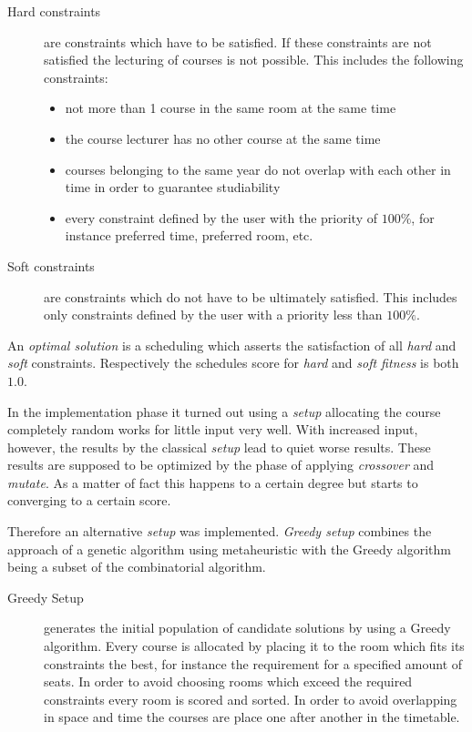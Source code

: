 \begin{description}
\item[Hard constraints] are constraints which have to be satisfied. If these constraints are not satisfied the lecturing of courses is not possible. This includes the following constraints:

\begin{itemize}
\item not more than 1 course in the same room at the same time

\item the course lecturer has no other course at the same time

\item courses belonging to the same year do not overlap with each other in time in order to guarantee studiability

\item every constraint defined by the user with the priority of $100\%$, for instance preferred time, preferred room, etc.
\end{itemize}

\item[Soft constraints] are constraints which do not have to be ultimately satisfied. This includes only constraints defined by the user with a priority less than $100\%$.
\end{description}

An \emph{optimal solution} is a scheduling which asserts the satisfaction of all \emph{hard} and \emph{soft} constraints. Respectively the schedules score for \emph{hard} and \emph{soft fitness} is both $1.0$.

In the implementation phase it turned out using a \emph{setup} allocating the course completely random works for little input very well. With increased input, however, the results by  the classical \emph{setup} lead to quiet worse results. These results are supposed to be optimized by the phase of applying \emph{crossover} and \emph{mutate}. As a matter of fact this happens to a certain degree but starts to converging to a certain score.

Therefore an alternative \emph{setup} was implemented. \emph{Greedy setup} combines the approach of a genetic algorithm using metaheuristic with the Greedy algorithm being a subset of the combinatorial algorithm.

\begin{description}
\item[Greedy Setup] generates the initial population of candidate solutions by using a Greedy algorithm. Every course is allocated by placing it to the room which fits its constraints the best, for instance the requirement for a specified amount of seats. In order to avoid choosing rooms which exceed the required constraints every room is scored and sorted. In order to avoid overlapping in space and time the courses are place one after another in the timetable.
\end{description}

